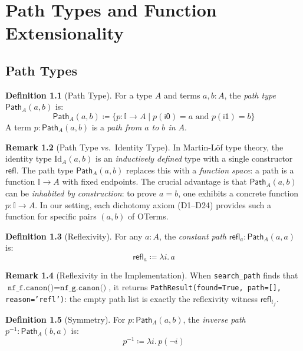 \documentclass[11pt,a4paper]{report}
\theoremstyle{definition}
\newtheorem{definition}{Definition}[chapter]
\newtheorem{remark}[definition]{Remark}
\theoremstyle{plain}
\newcommand{\Path}{\mathsf{Path}}
\newcommand{\interval}{\mathbb{I}}
\begin{document}
\chapter{Path Types and Function Extensionality}
\label{ch:paths}

\section{Path Types}

\begin{definition}[Path Type]
\label{def:path-type}
For a type $A$ and terms $a, b : A$, the \emph{path type}
$\Path_A(a, b)$ is:
\[
  \Path_A(a, b) \coloneqq \{p : \interval \to A \mid p(\mathsf{i0}) = a
    \text{ and } p(\mathsf{i1}) = b\}
\]
A term $p : \Path_A(a, b)$ is a \emph{path from $a$ to $b$ in $A$}.
\end{definition}

\begin{remark}[Path Type vs.\ Identity Type]
\label{rem:path-vs-id}
In Martin-L\"of type theory, the identity type $\mathrm{Id}_A(a, b)$
is an \emph{inductively defined} type with a single constructor
$\mathsf{refl}$.  The path type $\Path_A(a, b)$ replaces this with
a \emph{function space}: a path is a function $\interval \to A$ with
fixed endpoints.  The crucial advantage is that $\Path_A(a, b)$ can
be \emph{inhabited by construction}: to prove $a = b$, one exhibits
a concrete function $p : \interval \to A$.  In our setting, each
dichotomy axiom (D1--D24) provides such a function for specific pairs
$(a, b)$ of OTerms.
\end{remark}

\begin{definition}[Reflexivity]
For any $a : A$, the \emph{constant path} $\mathsf{refl}_a :
\Path_A(a, a)$ is:
\[
  \mathsf{refl}_a \coloneqq \lambda i.\, a
\]
\end{definition}

\begin{remark}[Reflexivity in the Implementation]
When \texttt{search\_path} finds that
$\texttt{nf\_f.canon()} = \texttt{nf\_g.canon()}$, it returns
\texttt{PathResult(found=True, path=[], reason='refl')}: the empty
path list is exactly the reflexivity witness $\mathsf{refl}_{t_f}$.
\end{remark}

\begin{definition}[Symmetry]
For $p : \Path_A(a, b)$, the \emph{inverse path} $p^{-1} :
\Path_A(b, a)$ is:
\[
  p^{-1} \coloneqq \lambda i.\, p(\lnot i)
\]
\end{definition}
\end{document}
